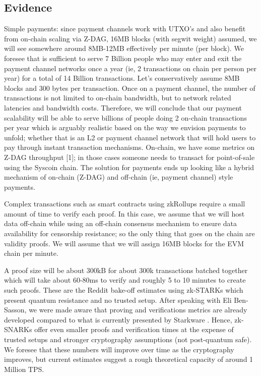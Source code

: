 \documentclass[peerreview]{ieeesyscoin}
\begin{document}
\subsection{Evidence}

Simple payments: since payment channels work with UTXO’s and also benefit from on-chain scaling via Z-DAG, 16MB blocks (with segwit weight) assumed, we will see somewhere around 8MB-12MB effectively per minute (per block). We foresee that is sufficient to serve 7 Billion people who may enter and exit the payment channel networks once a year (ie, 2 transactions on chain per person per year) for a total of 14 Billion transactions. Let’s conservatively assume 8MB blocks and 300 bytes per transaction. Once on a payment channel, the number of transactions is not limited to on-chain bandwidth, but to network related latencies and bandwidth costs. Therefore, we will conclude that our payment scalability will be able to serve billions of people doing 2 on-chain transactions per year which is arguably realistic based on the way we envision payments to unfold; whether that is an L2 or payment channel network that will hold users to pay through instant transaction mechanisms. On-chain, we have some metrics on Z-DAG throughput [1]; in those cases someone needs to transact for point-of-sale using the Syscoin chain. The solution for payments ends up looking like a hybrid mechanism of on-chain (Z-DAG) and off-chain (ie, payment channel) style payments.

Complex transactions such as smart contracts using zkRollups require a small amount of time to verify each proof. In this case, we assume that we will host data off-chain while using an off-chain consensus mechanism to ensure data availability for censorship resistance; so the only thing that goes on the chain are validity proofs. We will assume that we will assign 16MB blocks for the EVM chain per minute. 

A proof size will be about 300kB for about 300k transactions batched together which will take about 60-80ms to verify and roughly 5 to 10 minutes to create such proofs. These are the Reddit bake-off estimates using zk-STARKs which present quantum resistance and no trusted setup. After speaking with Eli Ben-Sasson, we were made aware that  proving and verifications metrics are already developed compared to  what is  currently presented by Starkware \cite{Sta20}. Hence, zk-SNARKs offer even smaller proofs and verification times at the expense of trusted setups and stronger cryptography assumptions (not post-quantum safe). We foresee that these numbers will improve over time as the cryptography improves, but current estimates suggest a rough theoretical capacity of around 1 Million TPS. 
\end{document}
